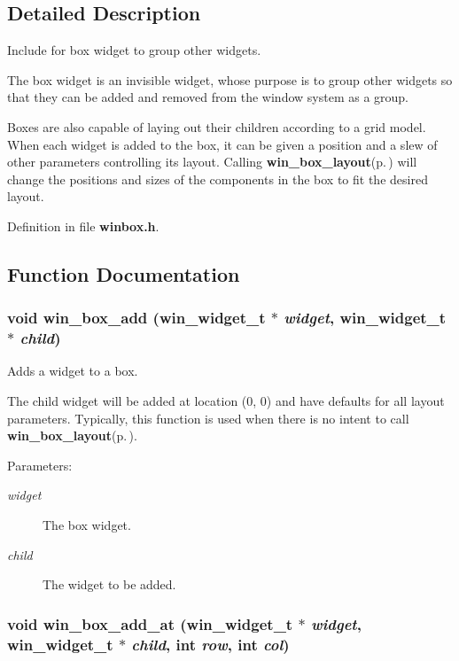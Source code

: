 \subsection{Detailed Description}
Include for box widget to group other widgets. 

The box widget is an invisible widget, whose purpose is to group other widgets so that they can be added and removed from the window system as a group.

Boxes are also capable of laying out their children according to a grid model. When each widget is added to the box, it can be given a position and a slew of other parameters controlling its layout. Calling {\bf win\_\-box\_\-layout}{\rm (p.\,\pageref{winbox_8h_a10})} will change the positions and sizes of the components in the box to fit the desired layout. 

Definition in file {\bf winbox.h}.

\subsection{Function Documentation}
\subsubsection{\setlength{\rightskip}{0pt plus 5cm}void win\_\-box\_\-add ({\bf win\_\-widget\_\-t} $\ast$ {\em widget}, {\bf win\_\-widget\_\-t} $\ast$ {\em child})}\label{winbox_8h_a6}


Adds a widget to a box. 

The child widget will be added at location (0, 0) and have defaults for all layout parameters. Typically, this function is used when there is no intent to call {\bf win\_\-box\_\-layout}{\rm (p.\,\pageref{winbox_8h_a10})}.

\begin{Desc}
\item[Parameters:]
\begin{description}
\item[{\em widget}]The box widget. \item[{\em child}]The widget to be added. \end{description}
\end{Desc}
\subsubsection{\setlength{\rightskip}{0pt plus 5cm}void win\_\-box\_\-add\_\-at ({\bf win\_\-widget\_\-t} $\ast$ {\em widget}, {\bf win\_\-widget\_\-t} $\ast$ {\em child}, int {\em row}, int {\em col})}\label{winbox_8h_a7}


